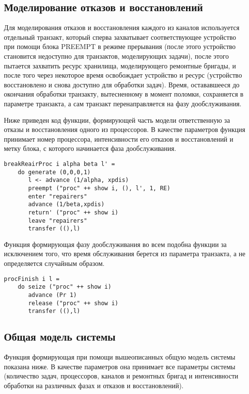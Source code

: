 \subsection{Моделирование отказов и восстановлений}

Для моделирования отказов и восстановления каждого из каналов используется отдельный транзакт, который сперва захватывает соответствующее устройство при помощи блока PREEMPT в режиме прерывания (после этого устройство становится недоступно для транзактов, моделирующих задачи), после этого пытается захватить ресурс хранилища, моделирующего ремонтные бригады, и после того через некоторое время освобождает устройство и ресурс (устройство восстановлено и снова доступно для обработки задач). Время, остававшееся до окончания обработки транзакту, вытесненному в момент поломки, сохраняется в  параметре транзакта, а сам транзакт перенаправляется на фазу дообслуживания.


Ниже приведен код функции, формирующей часть модели ответственную за отказы и восстановления одного из процессоров. В качестве параметров функция принимает номер процессора, интенсивности его отказов и восстановлений и метку блока, с которого начинается фаза дообслуживания.

\begin{verbatim}
breakReairProc i alpha beta l' = 
    do generate (0,0,0,1)
       l <- advance (1/alpha, xpdis)
       preempt ("proc" ++ show i, (), l', 1, RE)
       enter "repairers"
       advance (1/beta,xpdis)
       return' ("proc" ++ show i)
       leave "repairers"
       transfer ((),l)
\end{verbatim}

Функция формирующая фазу дообслуживания во всем подобна функции  за исключением того, что время обслуживания берется из параметра транзакта, а не определяется случайным образом.

\begin{verbatim}
procFinish i l =
    do seize ("proc" ++ show i)
       advance (Pr 1)
       release ("proc" ++ show i)
       transfer ((),l)
\end{verbatim}

\subsection {Общая модель системы}

Функция формирующая при помощи вышеописанных общую модель системы показана ниже. В качестве параметров она принимает все параметры системы (количество задач, процессоров, каналов и ремонтных бригад и интенсивности обработки на различных фазах и отказов и восстановлений).

